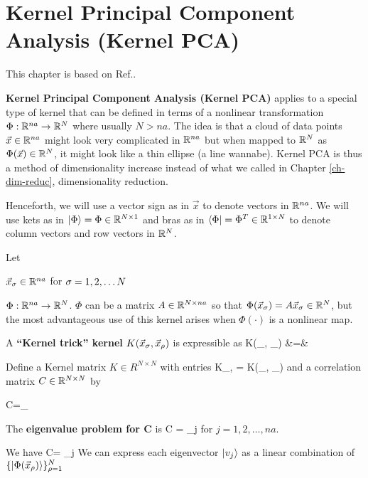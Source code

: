 \chapter{Kernel Principal Component Analysis (Kernel PCA)}
\label{ch-kernel-pca}

This chapter is based on Ref.\cite{wiki-kernel-pca}.

{\bf Kernel Principal Component Analysis (Kernel PCA)} applies
to a special type
of kernel that can be defined in terms of
a nonlinear transformation $\Phi:{ \mathbb{R}}^{na}\rightarrow { \mathbb{R}}^{N}$
where usually $N>na$. The idea is that a cloud of data points 
$\vec{x}\in{ \mathbb{R}}^{na}$ might look very complicated 
in ${ \mathbb{R}}^{na}$ but
when mapped to ${ \mathbb{R}}^N$ as $\Phi(\vec{x})\in{ \mathbb{R}}^N$, it might look like a thin ellipse (a line wannabe). Kernel PCA is thus a method of dimensionality increase instead of what
we called in Chapter \ref{ch-dim-reduc}, dimensionality
reduction.  

Henceforth, we will use a vector sign
as in $\vec{x}$ to denote 
vectors in ${ \mathbb{R}}^{na}$. We will use kets as in  $|\Phi\rangle=\Phi\in { \mathbb{R}}^{N\times 1}$ and bras as in $\langle\Phi|=\Phi^T\in { \mathbb{R}}^{1\times N}$ to denote  column vectors and row vectors in ${ \mathbb{R}}^N$.

Let

$\vec{x}_\sigma\in { \mathbb{R}}^{na}$ for  $\sigma=1,2,\ldots N$

$\Phi: { \mathbb{R}}^{na}\rightarrow { \mathbb{R}}^N$. $\Phi$ 
can be a matrix $A\in { \mathbb{R}}^{N\times na}$ so that $
\Phi (\vec{x}_\sigma)=A\vec{x}_\sigma\in{ \mathbb{R}}^N$,
but the most advantageous use of this
kernel arises when $\Phi(\cdot)$ is a nonlinear map.
 
A {\bf \enquote{Kernel trick} kernel} $K(\vec{x}_\sigma, \vec{x}_{\rho})$ is
expressible as
\beqa
K(_\s, _{\rho}) &=& 
\eeqa

Define a Kernel matrix $K\in R^{N\times N}$ with entries
\beq
K_{\s, \rho} = K(_\s, _{\rho})
\eeq
and a correlation matrix $C\in { \mathbb{R}}^{N\times N}$ by

\beqa
C=\sum_\s 
{}
\eeqa

The {\bf eigenvalue problem for C} is
\beq
C  = \lam_j 
\eeq
for $j=1,2, \ldots, na$.


We have
\beq
{} C=
\lam_j
\eeq
We can express each eigenvector $|v_j\rangle$
as a linear combination of  
$\{|\Phi(\vec{x}_\rho)\rangle\}_{\rho=1}^N$


